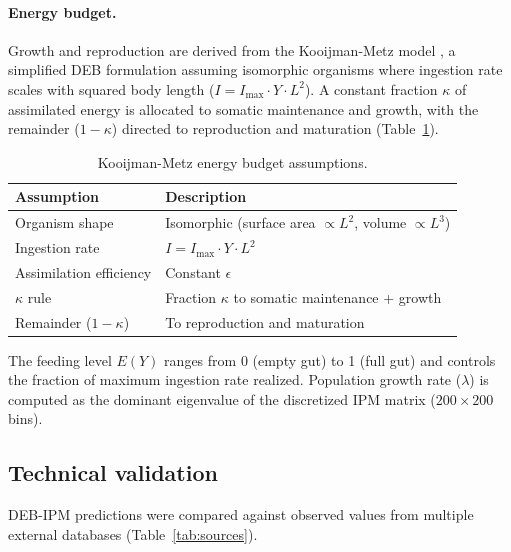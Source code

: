 \documentclass[11pt]{article}
\begin{document}
\paragraph{Energy budget.} Growth and reproduction are derived from the Kooijman-Metz model \citep{Kooijman2010}, a simplified DEB formulation assuming isomorphic organisms where ingestion rate scales with squared body length ($I = I_{\max} \cdot Y \cdot L^2$). A constant fraction $\kappa$ of assimilated energy is allocated to somatic maintenance and growth, with the remainder ($1 - \kappa$) directed to reproduction and maturation (Table~\ref{tab:energy}).

\begin{table}[ht]
\centering
\caption{Kooijman-Metz energy budget assumptions.}
\label{tab:energy}
\begin{tabular}{ll}
\toprule
Assumption & Description \\
\midrule
Organism shape & Isomorphic (surface area $\propto L^2$, volume $\propto L^3$) \\
Ingestion rate & $I = I_{\max} \cdot Y \cdot L^2$ \\
Assimilation efficiency & Constant $\epsilon$ \\
$\kappa$ rule & Fraction $\kappa$ to somatic maintenance + growth \\
Remainder ($1 - \kappa$) & To reproduction and maturation \\
\bottomrule
\end{tabular}
\end{table}

The feeding level $E(Y)$ ranges from 0 (empty gut) to 1 (full gut) and controls the fraction of maximum ingestion rate realized. Population growth rate ($\lambda$) is computed as the dominant eigenvalue of the discretized IPM matrix ($200 \times 200$ bins).

\subsection{Technical validation}

DEB-IPM predictions were compared against observed values from multiple external databases (Table~\ref{tab:sources}).
\end{document}
